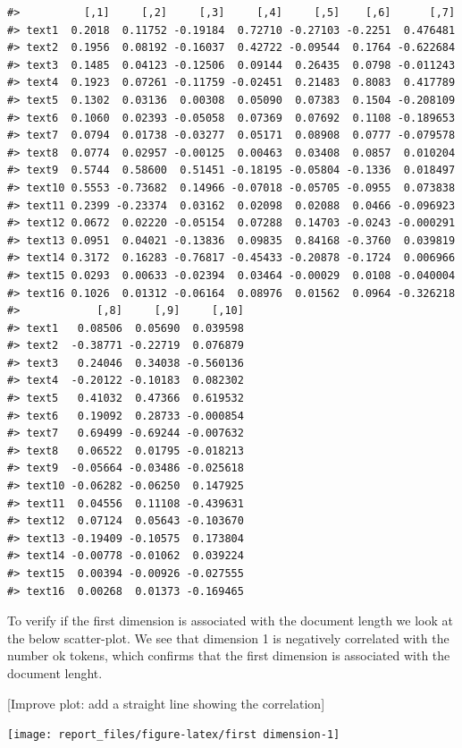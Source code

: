\documentclass[
]{article}
\begin{document}
\begin{verbatim}
#>          [,1]     [,2]     [,3]     [,4]     [,5]    [,6]      [,7]
#> text1  0.2018  0.11752 -0.19184  0.72710 -0.27103 -0.2251  0.476481
#> text2  0.1956  0.08192 -0.16037  0.42722 -0.09544  0.1764 -0.622684
#> text3  0.1485  0.04123 -0.12506  0.09144  0.26435  0.0798 -0.011243
#> text4  0.1923  0.07261 -0.11759 -0.02451  0.21483  0.8083  0.417789
#> text5  0.1302  0.03136  0.00308  0.05090  0.07383  0.1504 -0.208109
#> text6  0.1060  0.02393 -0.05058  0.07369  0.07692  0.1108 -0.189653
#> text7  0.0794  0.01738 -0.03277  0.05171  0.08908  0.0777 -0.079578
#> text8  0.0774  0.02957 -0.00125  0.00463  0.03408  0.0857  0.010204
#> text9  0.5744  0.58600  0.51451 -0.18195 -0.05804 -0.1336  0.018497
#> text10 0.5553 -0.73682  0.14966 -0.07018 -0.05705 -0.0955  0.073838
#> text11 0.2399 -0.23374  0.03162  0.02098  0.02088  0.0466 -0.096923
#> text12 0.0672  0.02220 -0.05154  0.07288  0.14703 -0.0243 -0.000291
#> text13 0.0951  0.04021 -0.13836  0.09835  0.84168 -0.3760  0.039819
#> text14 0.3172  0.16283 -0.76817 -0.45433 -0.20878 -0.1724  0.006966
#> text15 0.0293  0.00633 -0.02394  0.03464 -0.00029  0.0108 -0.040004
#> text16 0.1026  0.01312 -0.06164  0.08976  0.01562  0.0964 -0.326218
#>            [,8]     [,9]     [,10]
#> text1   0.08506  0.05690  0.039598
#> text2  -0.38771 -0.22719  0.076879
#> text3   0.24046  0.34038 -0.560136
#> text4  -0.20122 -0.10183  0.082302
#> text5   0.41032  0.47366  0.619532
#> text6   0.19092  0.28733 -0.000854
#> text7   0.69499 -0.69244 -0.007632
#> text8   0.06522  0.01795 -0.018213
#> text9  -0.05664 -0.03486 -0.025618
#> text10 -0.06282 -0.06250  0.147925
#> text11  0.04556  0.11108 -0.439631
#> text12  0.07124  0.05643 -0.103670
#> text13 -0.19409 -0.10575  0.173804
#> text14 -0.00778 -0.01062  0.039224
#> text15  0.00394 -0.00926 -0.027555
#> text16  0.00268  0.01373 -0.169465
\end{verbatim}

To verify if the first dimension is associated with the document length
we look at the below scatter-plot. We see that dimension 1 is negatively
correlated with the number ok tokens, which confirms that the first
dimension is associated with the document lenght.

{[}Improve plot: add a straight line showing the correlation{]}

\begin{center}\texttt{[image: report\_files/figure-latex/first dimension-1]} \end{center}
\end{document}
